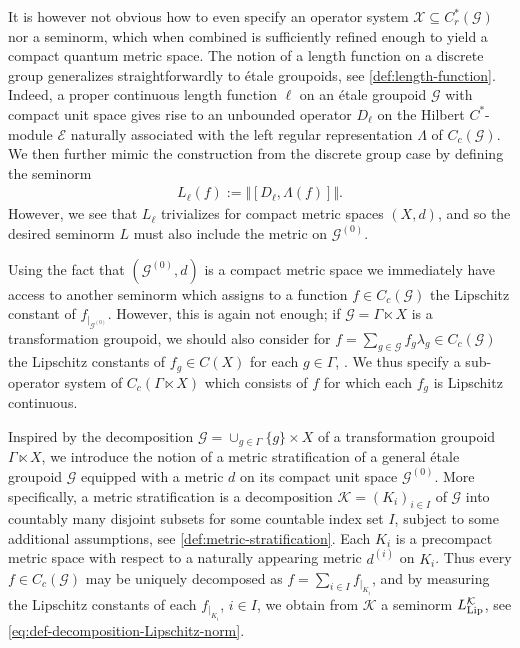 \documentclass[11pt,a4paper,oneside,final,reqno]{amsart}
\theoremstyle{definition}
\newcommand{\G}{\mathcal{G}}
\newcommand{\Go}{\mathcal{G}^{(0)}}
\newcommand{\cK}{\mathcal{K}}
\newcommand{\cX}{\mathcal{X}}
\newcommand{\cE}{\mathcal{E}}
\newcommand{\Cred}{C_{r}^{*}}
\numberwithin{equation}{section}
\begin{document}
	It is however not obvious how to even specify an operator system $\cX \subseteq \Cred (\G)$ nor a seminorm, which when combined is sufficiently refined enough  to yield a compact quantum metric space.
	The notion of a length function on a discrete group generalizes straightforwardly to \'etale groupoids, see \cref{def:length-function}. Indeed, a proper continuous length function $\ell$ on an \'etale groupoid $\G$ with compact unit space gives rise to an unbounded operator $D_\ell$ on the Hilbert $C^*$-module $\cE$ naturally associated with the left regular representation $\Lambda$ of $C_c(\G)$. We then further mimic the construction from the discrete group case by defining the seminorm
	\begin{align*}
		L_\ell (f) := \Vert [D_\ell, \Lambda(f)] \Vert .
	\end{align*}
	However, 
	we see that $L_\ell$ trivializes for compact metric spaces $(X,d)$, and so the desired seminorm $L$ must also include the metric on $\Go$. 
	
	
	Using the fact that $(\Go,d)$ is a compact metric space
	we immediately have access to another seminorm which assigns to a function $f\in C_c(\G)$ the Lipschitz constant of $f_{\vert_{\Go}}$. 
	However, this is again not enough; if $\G = \Gamma \ltimes X$ is a transformation groupoid, we should also consider for $f = \sum_{g\in \G} f_g \lambda_g \in C_c(\G)$ the Lipschitz constants of $f_g \in C(X)$ for each $g \in \Gamma$, \cite{BellissardMarcolliReihani2010, HawkinsSkalskiWhiteZacharias2013, KlisseCQMS, AustadKaadKyed2025}.
	We thus specify 
	a sub-operator system of 
	$C_c(\Gamma \ltimes X)$ 
	which consists of $f$ for which each $f_g$ is Lipschitz continuous. 
	
	Inspired by the decomposition $\G = \cup_{g \in \Gamma} \{g\} \times X$ of a transformation groupoid $\Gamma \ltimes X$, we introduce the notion of a metric stratification of a general \'etale groupoid $\G$ equipped with a metric $d$ on its compact unit space $\Go$. 
	More specifically, a metric stratification is a decomposition $\cK = (K_i)_{i\in I}$ of $\G$ into countably many disjoint subsets for some countable index set $I$, 
	subject to 
	some additional assumptions, 
	see \cref{def:metric-stratification}. 
	Each $K_i$ is a precompact metric space with respect to a naturally appearing metric $d^{(i)}$ on $K_i$.
	Thus every $f \in C_c(\G)$ may be uniquely decomposed as $f = \sum_{i\in I} f_{\vert_{K_i}}$,  
	and by
	measuring the Lipschitz constants of each $f_{\vert_{K_i}}$, $i \in I$, we obtain from $\cK$ a seminorm $L^\cK_{\rm Lip}$, see \eqref{eq:def-decomposition-Lipschitz-norm}.  
	
\end{document}
